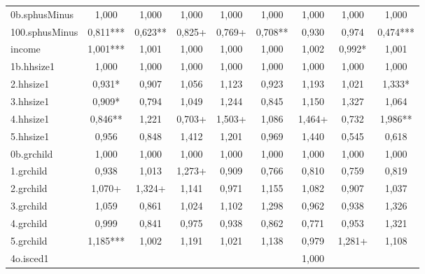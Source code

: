 {\begin{tabular}{l*{8}{c}}
0b.sphusMinus&       1,000   &       1,000   &       1,000   &       1,000   &       1,000   &       1,000   &       1,000   &       1,000   \\
100.sphusMinus&       0,811***&       0,623** &       0,825+  &       0,769+  &       0,708** &       0,930   &       0,974   &       0,474***\\
income      &       1,001***&       1,001   &       1,000   &       1,000   &       1,000   &       1,002   &       0,992*  &       1,001   \\
1b.hhsize1  &       1,000   &       1,000   &       1,000   &       1,000   &       1,000   &       1,000   &       1,000   &       1,000   \\
2.hhsize1   &       0,931*  &       0,907   &       1,056   &       1,123   &       0,923   &       1,193   &       1,021   &       1,333*  \\
3.hhsize1   &       0,909*  &       0,794   &       1,049   &       1,244   &       0,845   &       1,150   &       1,327   &       1,064   \\
4.hhsize1   &       0,846** &       1,221   &       0,703+  &       1,503+  &       1,086   &       1,464+  &       0,732   &       1,986** \\
5.hhsize1   &       0,956   &       0,848   &       1,412   &       1,201   &       0,969   &       1,440   &       0,545   &       0,618   \\
0b.grchild  &       1,000   &       1,000   &       1,000   &       1,000   &       1,000   &       1,000   &       1,000   &       1,000   \\
1.grchild   &       0,938   &       1,013   &       1,273+  &       0,909   &       0,766   &       0,810   &       0,759   &       0,819   \\
2.grchild   &       1,070+  &       1,324+  &       1,141   &       0,971   &       1,155   &       1,082   &       0,907   &       1,037   \\
3.grchild   &       1,059   &       0,861   &       1,024   &       1,102   &       1,298   &       0,962   &       0,938   &       1,326   \\
4.grchild   &       0,999   &       0,841   &       0,975   &       0,938   &       0,862   &       0,771   &       0,953   &       1,321   \\
5.grchild   &       1,185***&       1,002   &       1,191   &       1,021   &       1,138   &       0,979   &       1,281+  &       1,108   \\
4o.isced1   &               &               &               &               &               &       1,000   &               &               \\

\end{tabular}}
